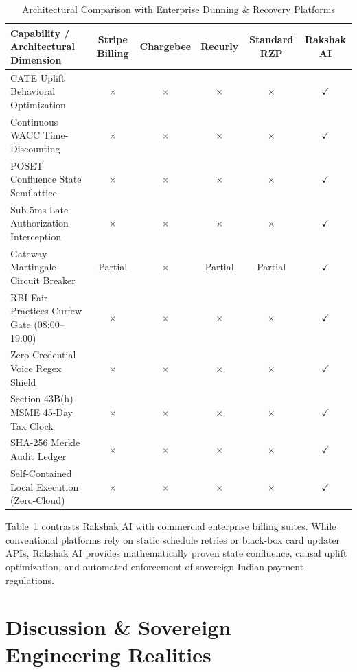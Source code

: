 \documentclass[10pt, twocolumn, a4paper]{article}
\begin{document}
\begin{table}[t]
\centering
\small
\caption{Architectural Comparison with Enterprise Dunning \& Recovery Platforms}
\label{tab:competitor_comparison}
\begin{tabularx}{\textwidth}{Xccccc}
\toprule
\textbf{Capability / Architectural Dimension} & \textbf{Stripe Billing} & \textbf{Chargebee} & \textbf{Recurly} & \textbf{Standard RZP} & \textbf{Rakshak AI} \\
\midrule
CATE Uplift Behavioral Optimization & $\times$ & $\times$ & $\times$ & $\times$ & $\checkmark$ \\
Continuous WACC Time-Discounting & $\times$ & $\times$ & $\times$ & $\times$ & $\checkmark$ \\
POSET Confluence State Semilattice & $\times$ & $\times$ & $\times$ & $\times$ & $\checkmark$ \\
Sub-5ms Late Authorization Interception & $\times$ & $\times$ & $\times$ & $\times$ & $\checkmark$ \\
Gateway Martingale Circuit Breaker & Partial & $\times$ & Partial & Partial & $\checkmark$ \\
RBI Fair Practices Curfew Gate (08:00--19:00) & $\times$ & $\times$ & $\times$ & $\times$ & $\checkmark$ \\
Zero-Credential Voice Regex Shield & $\times$ & $\times$ & $\times$ & $\times$ & $\checkmark$ \\
Section 43B(h) MSME 45-Day Tax Clock & $\times$ & $\times$ & $\times$ & $\times$ & $\checkmark$ \\
SHA-256 Merkle Audit Ledger & $\times$ & $\times$ & $\times$ & $\times$ & $\checkmark$ \\
Self-Contained Local Execution (Zero-Cloud) & $\times$ & $\times$ & $\times$ & $\times$ & $\checkmark$ \\
\bottomrule
\end{tabularx}
\end{table}

Table~\ref{tab:competitor_comparison} contrasts Rakshak AI with commercial enterprise billing suites. While conventional platforms rely on static schedule retries or black-box card updater APIs, Rakshak AI provides mathematically proven state confluence, causal uplift optimization, and automated enforcement of sovereign Indian payment regulations.

\section{Discussion \& Sovereign Engineering Realities}
\end{document}
